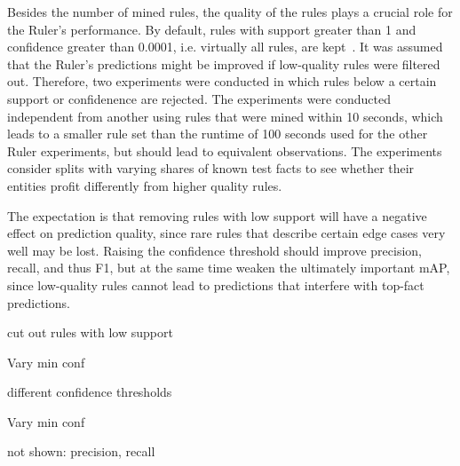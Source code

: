 Besides the number of mined rules, the quality of the rules plays a crucial role for the Ruler's performance. By default, rules with support greater than 1 and confidence greater than 0.0001, i.e. virtually all rules, are kept~\cite{AnyBURL}. It was assumed that the Ruler's predictions might be improved if low-quality rules were filtered out. Therefore, two experiments were conducted in which rules below a certain support or confidenence are rejected. The experiments were conducted independent from another using rules that were mined within 10 seconds, which leads to a smaller rule set than the runtime of 100 seconds used for the other Ruler experiments, but should lead to equivalent observations. The experiments consider splits with varying shares of known test facts to see whether their entities profit differently from higher quality rules.



The expectation is that removing rules with low support will have a negative effect on prediction quality, since rare rules that describe certain edge cases very well may be lost. Raising the confidence threshold should improve precision, recall, and thus F1, but at the same time weaken the ultimately important mAP, since low-quality rules cannot lead to predictions that interfere with top-fact predictions.





cut out rules with low support

\begin{table}
    \centering
    
    \caption{Vary min conf}
    \label{tab:5_experiments/5_ruler/3_rule_quality/supp_results}
\end{table}

different confidence thresholds

\begin{table}
    \centering
    
    \caption{Vary min conf}
    \label{tab:5_experiments/5_ruler/3_rule_quality/conf_results}
\end{table}

not shown: precision, recall
